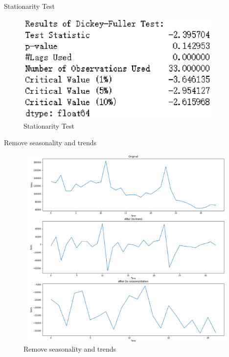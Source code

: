 \documentclass[
 size=12pt,
 paper=smartboard, %
 mode=present, %
 display=slides, %
 style=tuliplab,  %
 pauseslide,
 fleqn,leqno,clock]{powerdot}
\begin{document}
\begin{slide}{Stationarity Test}
  \begin{figure}
    \centering
    \includegraphics[width=4in]{Figures/10.eps}
    \caption{Stationarity Test}
    \label{Stationarity Test}
  \end{figure}
\end{slide}

\begin{slide}{Remove seasonality and trends}
  \begin{figure}
    \centering
    \includegraphics[width=6in,height=4in]{Figures/11.eps}
    \caption{Remove seasonality and trends}
    \label{Remove seasonality and trends}
  \end{figure}
\end{slide}
\end{document}
